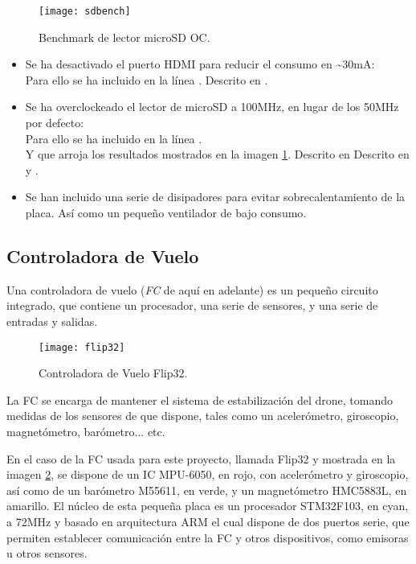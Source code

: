 \begin{figure}
	\centering
	\texttt{[image: sdbench]}
	\caption{Benchmark de lector microSD OC.}\label{fig:sdbenchmark}
\end{figure}

\begin{itemize}
\item Se ha desactivado el puerto HDMI para reducir el consumo en \textasciitilde{}30mA: \\Para ello se ha incluido en  la línea . Descrito en \citep{wiki:PowerSaving}.
\item Se ha overclockeado el lector de microSD a 100MHz, en lugar de los 50MHz por defecto: \\Para ello se ha incluido en  la línea .\\Y que arroja los resultados mostrados en la imagen \ref{fig:sdbenchmark}. Descrito en  Descrito en \citep{wiki:OCSD} y \citep{wiki:OCSDWifiFix}.
\item Se han incluido una serie de disipadores para evitar sobrecalentamiento de la placa. Así como un pequeño ventilador de bajo consumo.
\end{itemize} 


\subsection{Controladora de Vuelo}

Una controladora de vuelo (\textit{FC} de aquí en adelante) es un pequeño circuito integrado, que contiene un procesador, una serie de sensores, y una serie de entradas y salidas. 
\begin{figure}
\centering
\texttt{[image: flip32]}
\caption{Controladora de Vuelo Flip32.}\label{fig:fc}
\end{figure}
La FC se encarga de mantener el sistema de estabilización del drone, tomando medidas de los sensores de que dispone, tales como un acelerómetro, giroscopio, magnetómetro, barómetro... etc. 

En el caso de la FC usada para este proyecto, llamada Flip32 y mostrada en la imagen \ref{fig:fc}, se dispone de un IC MPU-6050, en rojo, con acelerómetro y giroscopio, así como de un barómetro M55611, en verde, y un magnetómetro HMC5883L, en amarillo.
El núcleo de esta pequeña placa es un procesador STM32F103, en cyan, a 72MHz y basado en arquitectura ARM el cual dispone de dos puertos serie, que permiten establecer comunicación entre la FC y otros dispositivos, como emisoras u otros sensores.

